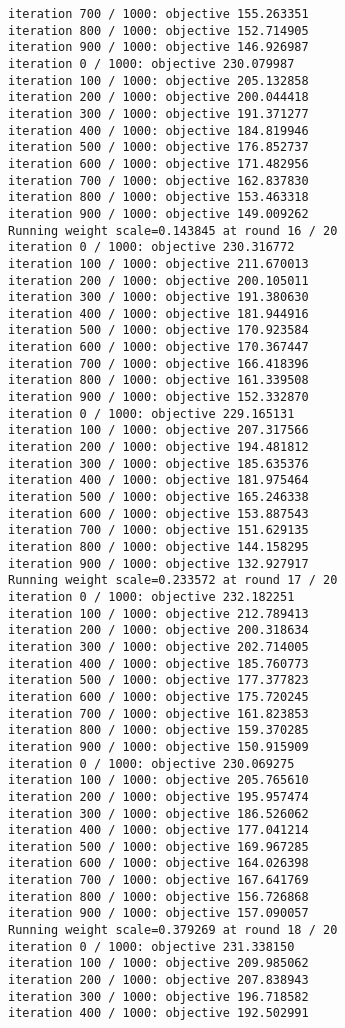 \documentclass[11pt]{article}
\begin{document}
\begin{Verbatim}[commandchars=\\\{\}]
iteration 700 / 1000: objective 155.263351
iteration 800 / 1000: objective 152.714905
iteration 900 / 1000: objective 146.926987
iteration 0 / 1000: objective 230.079987
iteration 100 / 1000: objective 205.132858
iteration 200 / 1000: objective 200.044418
iteration 300 / 1000: objective 191.371277
iteration 400 / 1000: objective 184.819946
iteration 500 / 1000: objective 176.852737
iteration 600 / 1000: objective 171.482956
iteration 700 / 1000: objective 162.837830
iteration 800 / 1000: objective 153.463318
iteration 900 / 1000: objective 149.009262
Running weight scale=0.143845 at round 16 / 20
iteration 0 / 1000: objective 230.316772
iteration 100 / 1000: objective 211.670013
iteration 200 / 1000: objective 200.105011
iteration 300 / 1000: objective 191.380630
iteration 400 / 1000: objective 181.944916
iteration 500 / 1000: objective 170.923584
iteration 600 / 1000: objective 170.367447
iteration 700 / 1000: objective 166.418396
iteration 800 / 1000: objective 161.339508
iteration 900 / 1000: objective 152.332870
iteration 0 / 1000: objective 229.165131
iteration 100 / 1000: objective 207.317566
iteration 200 / 1000: objective 194.481812
iteration 300 / 1000: objective 185.635376
iteration 400 / 1000: objective 181.975464
iteration 500 / 1000: objective 165.246338
iteration 600 / 1000: objective 153.887543
iteration 700 / 1000: objective 151.629135
iteration 800 / 1000: objective 144.158295
iteration 900 / 1000: objective 132.927917
Running weight scale=0.233572 at round 17 / 20
iteration 0 / 1000: objective 232.182251
iteration 100 / 1000: objective 212.789413
iteration 200 / 1000: objective 200.318634
iteration 300 / 1000: objective 202.714005
iteration 400 / 1000: objective 185.760773
iteration 500 / 1000: objective 177.377823
iteration 600 / 1000: objective 175.720245
iteration 700 / 1000: objective 161.823853
iteration 800 / 1000: objective 159.370285
iteration 900 / 1000: objective 150.915909
iteration 0 / 1000: objective 230.069275
iteration 100 / 1000: objective 205.765610
iteration 200 / 1000: objective 195.957474
iteration 300 / 1000: objective 186.526062
iteration 400 / 1000: objective 177.041214
iteration 500 / 1000: objective 169.967285
iteration 600 / 1000: objective 164.026398
iteration 700 / 1000: objective 167.641769
iteration 800 / 1000: objective 156.726868
iteration 900 / 1000: objective 157.090057
Running weight scale=0.379269 at round 18 / 20
iteration 0 / 1000: objective 231.338150
iteration 100 / 1000: objective 209.985062
iteration 200 / 1000: objective 207.838943
iteration 300 / 1000: objective 196.718582
iteration 400 / 1000: objective 192.502991

\end{Verbatim}
\end{document}
